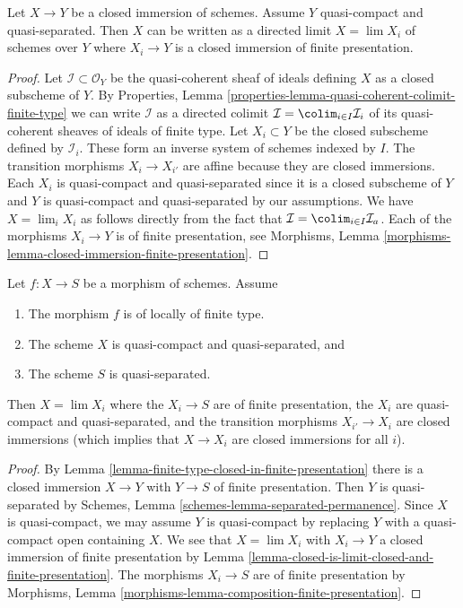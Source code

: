\begin{lemma}
\label{lemma-closed-is-limit-closed-and-finite-presentation}
Let $X \to Y$ be a closed immersion of schemes. Assume $Y$ quasi-compact and
quasi-separated. Then $X$ can be written as a directed limit $X = \lim X_i$
of schemes over $Y$ where $X_i \to Y$ is a closed immersion
of finite presentation.
\end{lemma}

\begin{proof}
Let $\mathcal{I} \subset \mathcal{O}_Y$ be the quasi-coherent sheaf of
ideals defining $X$ as a closed subscheme of $Y$. By
Properties, Lemma \ref{properties-lemma-quasi-coherent-colimit-finite-type}
we can write $\mathcal{I}$ as a directed colimit
$\mathcal{I} = \colim_{i \in I} \mathcal{I}_i$ of its
quasi-coherent sheaves of ideals of finite type.
Let $X_i \subset Y$ be the closed subscheme defined by $\mathcal{I}_i$.
These form an inverse system of schemes indexed by $I$.
The transition morphisms $X_i \to X_{i'}$ are affine because
they are closed immersions. Each $X_i$ is quasi-compact and quasi-separated
since it is a closed subscheme of $Y$ and $Y$ is quasi-compact and
quasi-separated by our assumptions.
We have $X = \lim_i X_i$ as follows directly from the
fact that $\mathcal{I} = \colim_{i \in I} \mathcal{I}_a$.
Each of the morphisms $X_i \to Y$ is of finite presentation, see
Morphisms, Lemma \ref{morphisms-lemma-closed-immersion-finite-presentation}.
\end{proof}

\begin{lemma}
\label{lemma-finite-type-is-limit-finite-presentation}
Let $f : X \to S$ be a morphism of schemes. Assume
\begin{enumerate}
\item The morphism $f$ is of locally of finite type.
\item The scheme $X$ is quasi-compact and quasi-separated, and
\item The scheme $S$ is quasi-separated.
\end{enumerate}
Then $X = \lim X_i$ where the $X_i \to S$ are of
finite presentation, the $X_i$ are quasi-compact and quasi-separated,
and the transition morphisms $X_{i'} \to X_i$ are closed immersions
(which implies that $X \to X_i$ are closed immersions for all $i$).
\end{lemma}

\begin{proof}
By Lemma \ref{lemma-finite-type-closed-in-finite-presentation}
there is a closed immersion $X \to Y$ with $Y \to S$ of
finite presentation. Then $Y$ is quasi-separated by
Schemes, Lemma \ref{schemes-lemma-separated-permanence}.
Since $X$ is quasi-compact, we may assume
$Y$ is quasi-compact by replacing $Y$ with a quasi-compact open
containing $X$. We see that $X = \lim X_i$ with $X_i \to Y$ a closed
immersion of finite presentation by
Lemma \ref{lemma-closed-is-limit-closed-and-finite-presentation}.
The morphisms $X_i \to S$ are of finite presentation by
Morphisms, Lemma \ref{morphisms-lemma-composition-finite-presentation}.
\end{proof}

